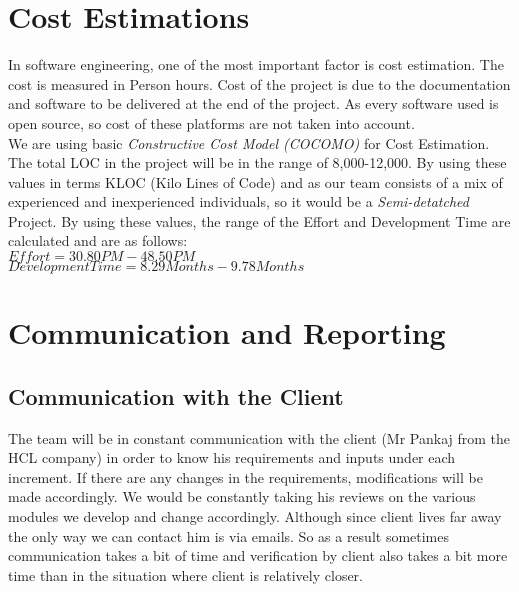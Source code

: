 \documentclass[
10pt, %
a4paper, %
oneside, %
headinclude,footinclude, %
BCOR5mm, %
]{scrartcl}
\begin{document}
\section{Cost Estimations}
In software engineering, one of the most important factor is cost estimation. The cost is measured in Person hours. Cost of the project is due to the documentation and software to be delivered at the end of the project. As every software used is open source, so cost of these platforms are not taken into account.
\\ We are using basic \textit{Constructive Cost Model (COCOMO)} for Cost Estimation.
\\The total LOC in the project will be in the range of 8,000-12,000. By using these values in terms KLOC (Kilo Lines of Code) and as our team consists of a mix of experienced and inexperienced individuals, so it would be a \textit{Semi-detatched} Project.
By using these values, the range of the Eﬀort and Development Time are calculated and are as follows:
\\$Effort = 30.80PM - 48.50PM$ 
\\$Development Time = 8.29 Months - 9.78 Months$




\section{Communication and Reporting}
\subsection{Communication with the Client}
The team will be in constant communication with the client (Mr Pankaj from the HCL company) in order to know his requirements and inputs under each increment. If there are any changes in the requirements, modifications will be made accordingly. We would be constantly taking his reviews on the various modules we develop and change accordingly. Although since client lives far away the only way we can contact him is via emails. So as a result sometimes communication takes a bit of time and verification by client also takes a bit more time than in the situation where client is relatively closer.
\end{document}
